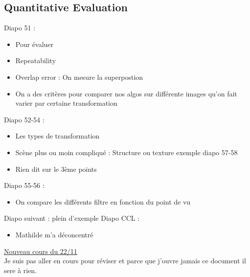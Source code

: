 \documentclass{article}
\theoremstyle{plain}%
\theoremstyle{definition}
\theoremstyle{remark}
\begin{document}
\subsection{Quantitative Evaluation}
Diapo 51 : 
\begin{itemize}
    \item Pour évaluer 
    \item Repeatability 
    \item Overlap error : On mesure la superpostion 
    \item On a des critères pour comparer nos algos sur différente images qu'on fait varier par certaine transformation
\end{itemize}
Diapo 52-54 : 
\begin{itemize}
    \item Les types de transformation 
    \item Scène plus ou moin compliqué : Structure ou texture exemple diapo 57-58
    \item Rien dit sur le 3ème points
\end{itemize}
Diapo 55-56 :
\begin{itemize}
    \item On compare les différents filtre en fonction du point de vu
\end{itemize}
Diapo suivant : plein d'exemple 
Diapo CCL : 
\begin{itemize}
    \item Mathilde m'a déconcentré 
\end{itemize}


\underline{Nouveau cours du 22/11} \\
Je suis pas aller en cours pour réviser et parce que j'ouvre jamais ce document il sere à rien.
\end{document}
